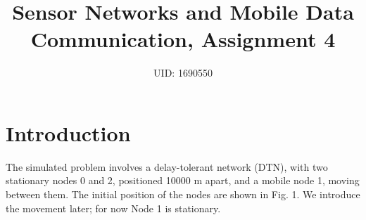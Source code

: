 \documentclass[11pt,journal]{article}
\begin{document}
	\title{Sensor Networks and Mobile Data Communication, Assignment 4}
	
	\author{UID: 1690550}%
	



	
	
	\maketitle
	
	
	
	
	\section{Introduction}
	The simulated problem involves a delay-tolerant network (DTN), with two stationary nodes 0 and 2, positioned 10000 m apart, and a mobile node 1, moving between them. The initial position of the nodes are shown in Fig. 1. We introduce the movement later; for now Node 1 is stationary.
	
\end{document}
